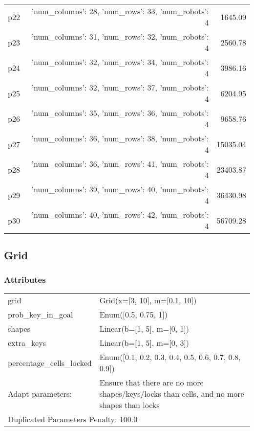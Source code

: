 \documentclass{article}
\begin{document}
\begin{center}
\begin{tabular}{@{}l|r|r@{}}
  p22&{'num\_columns': 28, 'num\_rows': 33, 'num\_robots': 4}&1645.09\\
  p23&{'num\_columns': 31, 'num\_rows': 32, 'num\_robots': 4}&2560.78\\
  p24&{'num\_columns': 32, 'num\_rows': 34, 'num\_robots': 4}&3986.16\\
  p25&{'num\_columns': 32, 'num\_rows': 37, 'num\_robots': 4}&6204.95\\
  p26&{'num\_columns': 35, 'num\_rows': 36, 'num\_robots': 4}&9658.76\\
  p27&{'num\_columns': 36, 'num\_rows': 38, 'num\_robots': 4}&15035.04\\
  p28&{'num\_columns': 36, 'num\_rows': 41, 'num\_robots': 4}&23403.87\\
  p29&{'num\_columns': 39, 'num\_rows': 40, 'num\_robots': 4}&36430.98\\
  p30&{'num\_columns': 40, 'num\_rows': 42, 'num\_robots': 4}&56709.28
                            \end{tabular}
                            \end{center}
                    
                            \newpage \subsection{Grid}
                    \subsubsection*{Attributes}
                    \begin{tabular}{@{}p{}p{}@{}}
                    \toprule
                    grid & Grid(x=[3, 10], m=[0.1, 10])\\
prob\_key\_in\_goal & Enum([0.5, 0.75, 1])\\
shapes & Linear(b=[1, 5], m=[0, 1])\\
extra\_keys & Linear(b=[1, 5], m=[0, 3])\\
percentage\_cells\_locked & Enum([0.1, 0.2, 0.3, 0.4, 0.5, 0.6, 0.7, 0.8, 0.9])
                    \\\midrule
                    Adapt parameters: & Ensure that there are no more shapes/keys/locks than cells, and no more shapes than locks \\
                    \bottomrule
                    \multicolumn{2}{l}{Duplicated Parameters Penalty: 100.0}
                    \end{tabular}
                
\end{document}
